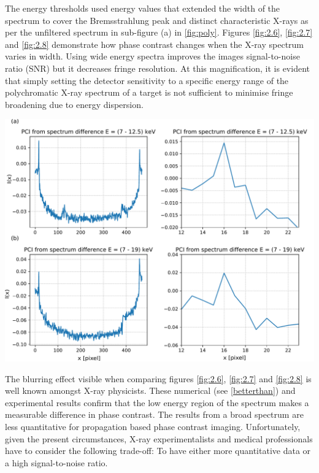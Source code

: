 \documentclass[10pt, a4paper, singlespacing]{report}
\newenvironment{Figure}
    {\par\medskip\noindent\minipage{\linewidth}}
    {\endminipage\par\medskip}
\begin{document}
The energy thresholds used energy values that extended the width of the spectrum to cover the Bremsstrahlung peak and distinct characteristic X-rays as per the unfiltered spectrum in sub-figure (a) in \ref{fig:poly}. Figures \ref{fig:2.6}, \ref{fig:2.7} and \ref{fig:2.8} demonstrate how phase contrast changes when the X-ray spectrum varies in width. Using wide energy spectra improves the images signal-to-noise ratio (SNR) but it decreases fringe resolution. At this magnification, it is evident that simply setting the detector sensitivity to a specific energy range of the polychromatic X-ray spectrum of a target is not sufficient to minimise fringe broadening due to energy dispersion. 
\begin{Figure}
 \centering
 \includegraphics[width=\linewidth]{diff.pdf}
\label{fig:2.9}  
\end{Figure}
The blurring effect visible when comparing figures \ref{fig:2.6}, \ref{fig:2.7} and \ref{fig:2.8} is well known amongst X-ray physicists. These numerical (see \ref{betterthan}) and experimental results confirm that the low energy region of the spectrum makes a measurable difference in phase contrast. The results from a broad spectrum are less quantitative for propagation based phase contrast imaging. Unfortunately, given the present circumstances, X-ray experimentalists and medical professionals have to consider the following trade-off: To have either more quantitative data or a high signal-to-noise ratio.
\end{document}
